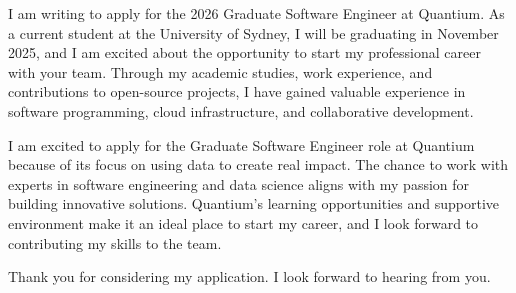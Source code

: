 \documentclass[11pt, a4paper]{awesome-cv}
\begin{document}
\makecvheader[R]

\makecvfooter
  {}
  {}
  {}

\makelettertitle

\begin{cvletter}

I am writing to apply for the 2026 Graduate Software Engineer at Quantium.
As a current student at the University of Sydney, I will be graduating in November 2025, and I am excited about the opportunity to start my professional career with your team.
Through my academic studies, work experience, and contributions to open-source projects, I have gained valuable experience in software programming, cloud infrastructure, and collaborative development.

I am excited to apply for the Graduate Software Engineer role at Quantium because of its focus on using data to create real impact.
The chance to work with experts in software engineering and data science aligns with my passion for building innovative solutions.
Quantium's learning opportunities and supportive environment make it an ideal place to start my career, and I look forward to contributing my skills to the team.

Thank you for considering my application.
I look forward to hearing from you.

\end{cvletter}


\makeletterclosing
\end{document}
